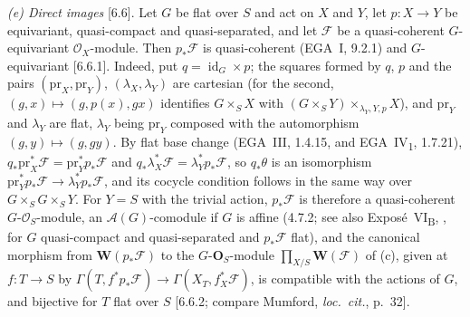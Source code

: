 \par\smallskip\noindent\textit{(e) Direct images} [6.6].
Let \(G\) be flat over \(S\) and act on \(X\) and \(Y\), let \(p:X\to Y\) be
equivariant, quasi-compact and quasi-separated, and let \(\mathscr F\) be a
quasi-coherent \(G\)-equivariant \(\mathcal O_X\)-module. Then
\(p_*\mathscr F\) is quasi-coherent (EGA~I, 9.2.1) and \(G\)-equivariant
[6.6.1]. Indeed, put \(q=\operatorname{id}_G\times p\); the squares formed by
\(q\), \(p\) and the pairs \((\mathrm{pr}_X,\mathrm{pr}_Y)\),
\((\lambda_X,\lambda_Y)\) are cartesian (for the second,
\((g,x)\mapsto(g,p(x),gx)\) identifies \(G\times_SX\) with
\((G\times_SY)\times_{\lambda_Y,Y,p}X\)), and \(\mathrm{pr}_Y\) and
\(\lambda_Y\) are flat, \(\lambda_Y\) being \(\mathrm{pr}_Y\) composed with
the automorphism \((g,y)\mapsto(g,gy)\). By flat base change (EGA~III,
1.4.15, and EGA~IV\textsubscript{1}, 1.7.21),
\(q_*\mathrm{pr}_X^*\mathscr F=\mathrm{pr}_Y^*p_*\mathscr F\) and
\(q_*\lambda_X^*\mathscr F=\lambda_Y^*p_*\mathscr F\), so \(q_*\theta\) is an
isomorphism \(\mathrm{pr}_Y^*p_*\mathscr F\to\lambda_Y^*p_*\mathscr F\), and
its cocycle condition follows in the same way over \(G\times_SG\times_SY\).
For \(Y=S\) with the trivial action, \(p_*\mathscr F\) is therefore a
quasi-coherent \(G\)-\(\mathcal O_S\)-module, an \(\mathscr A(G)\)-comodule
if \(G\) is affine (4.7.2; see also Exposé~VI\textsubscript{B}, ,
for \(G\) quasi-compact and quasi-separated and \(p_*\mathscr F\) flat), and
the canonical morphism from \(\mathbf W(p_*\mathscr F)\) to the
\(G\)-\(\mathbf O_S\)-module \(\prod_{X/S}\mathbf W(\mathscr F)\) of (c), given
at \(f:T\to S\) by
\(\Gamma(T,f^*p_*\mathscr F)\to\Gamma(X_T,f_X^*\mathscr F)\), is compatible
with the actions of \(G\), and bijective for \(T\) flat over \(S\) [6.6.2;
compare Mumford, \textit{loc.\ cit.}, p.~32].

